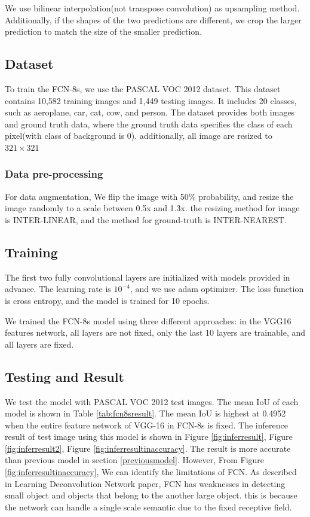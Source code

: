 \documentclass[extendedabs]{bmvc2k}
\begin{document}
We use bilinear interpolation(not transpose convolution) as upsampling method. Additionally, if the shapes of the two predictions are different, we crop the larger prediction to match the size of the smaller prediction.

\subsection{Dataset}
To train the FCN-8s, we use the PASCAL VOC 2012 dataset. This dataset contains 10,582 training images and 1,449 testing images. It includes 20 classes, such as aeroplane, car, cat, cow, and person. The dataset provides both images and ground truth data, where the ground truth data specifies the class of each pixel(with class of background is 0). additionally, all image are resized to $321\times321$
\subsubsection{Data pre-processing}
For data augmentation, We flip the image with 50\% probability, and resize the image randomly to a scale between 0.5x and 1.3x. the resizing method for image is INTER-LINEAR, and the method for ground-truth is INTER-NEAREST.
\subsection{Training}
The first two fully convolutional layers are initialized with models provided in advance. The learning rate is $10^{-4}$, and we use adam optimizer. The loss function is cross entropy, and the model is trained for 10 epochs.

We trained the FCN-8s model using three different approaches: in the VGG16 features network, all layers are not fixed, only the last 10 layers are trainable, and all layers are fixed.

\subsection{Testing and Result}
We test the model with PASCAL VOC 2012 test images. The mean IoU of each model is shown in Table \ref{tab:fcn8sresult}. The mean IoU is highest at 0.4952 when the entire feature network of VGG-16 in FCN-8s is fixed. The inference result of test image using this model is shown in Figure \ref{fig:inferresult}, Figure \ref{fig:inferresult2}, Figure \ref{fig:inferresultinaccuracy}. The result is more accurate than previous model in section \ref{previousmodel}. However, From Figure \ref{fig:inferresultinaccuracy}, We can identify the limitations of FCN. As described in Learning Deconvolution Network paper\cite{learningdeconv}, FCN has weaknesses in detecting small object and objects that belong to the another large object. this is because the network can handle a single scale semantic due to the fixed receptive field.
\end{document}
